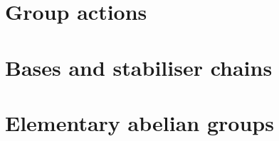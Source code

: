 \section{Group actions}



\section{Bases and stabiliser chains}\label{sec:bases_stabiliser_chains}



\section{Elementary abelian groups}

